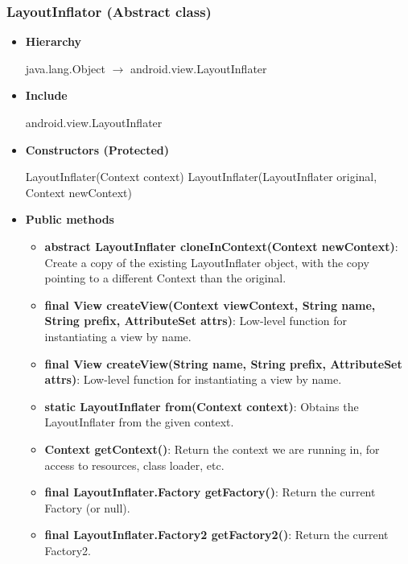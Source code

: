 \documentclass{report}
\begin{document}
\begin{itemize}
    \pagebreak 
    \subsubsection{LayoutInflator (Abstract class)}
    \begin{itemize}
        \item \textbf{Hierarchy}
            \begin{center}
                java.lang.Object $\to$	android.view.LayoutInflater
            \end{center}
        \item \textbf{Include}
            \bigbreak \noindent 
            \begin{javacode}
                android.view.LayoutInflater
            \end{javacode}
        \item \textbf{Constructors (Protected)}
            \bigbreak \noindent 
            \begin{javacode}
                LayoutInflater(Context context)
                LayoutInflater(LayoutInflater original, Context newContext)
            \end{javacode}
        \item \textbf{Public methods}
            \begin{itemize}
                \item \textbf{abstract LayoutInflater	cloneInContext(Context newContext)}: Create a copy of the existing LayoutInflater object, with the copy pointing to a different Context than the original.
                \item \textbf{final View	createView(Context viewContext, String name, String prefix, AttributeSet attrs)}: Low-level function for instantiating a view by name.
                \item \textbf{final View	createView(String name, String prefix, AttributeSet attrs)}: Low-level function for instantiating a view by name.
                \item \textbf{static LayoutInflater	from(Context context)}: Obtains the LayoutInflater from the given context.
                \item \textbf{Context	getContext()}: Return the context we are running in, for access to resources, class loader, etc.
                \item \textbf{final LayoutInflater.Factory	getFactory()}: Return the current Factory (or null).
                \item \textbf{final LayoutInflater.Factory2	getFactory2()}: Return the current Factory2.

\end{itemize}
\end{itemize}
\end{itemize}
\end{document}
